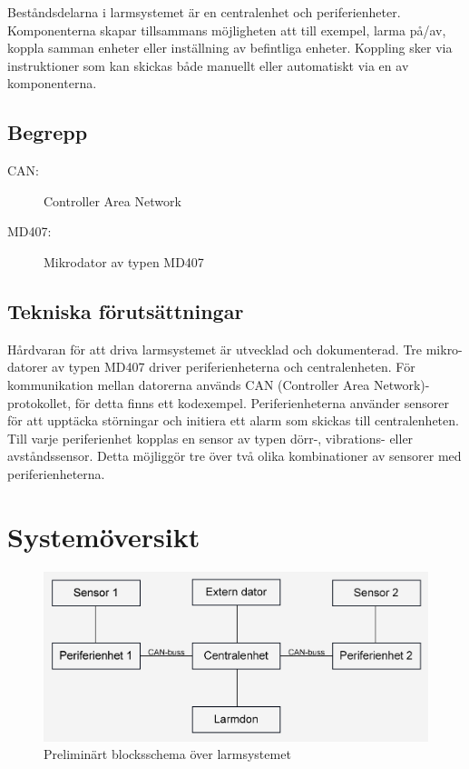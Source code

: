 \documentclass[a4paper]{article}
\begin{document}
Beståndsdelarna i larmsystemet är en centralenhet och periferienheter. Komponenterna skapar tillsammans möjligheten att till exempel, larma på/av, koppla samman enheter eller inställning av befintliga enheter. Koppling sker via instruktioner som kan skickas både manuellt eller automatiskt via en av komponenterna.

\subsection{Begrepp}

\begin{description}
    \item[CAN:] Controller Area Network
    \item[MD407:] Mikrodator av typen MD407
\end{description}


\subsection{Tekniska förutsättningar}

Hårdvaran för att driva larmsystemet är utvecklad och dokumenterad. Tre mikro-datorer av typen MD407 driver periferienheterna och centralenheten. För kommunikation mellan datorerna används CAN (Controller Area Network)-protokollet, för detta finns ett kodexempel. Periferienheterna använder sensorer för att upptäcka störningar och initiera ett alarm som skickas till centralenheten. Till varje periferienhet kopplas en sensor av typen dörr-, vibrations- eller avståndssensor. Detta möjliggör tre över två olika kombinationer av sensorer med periferienheterna.

\section{Systemöversikt}

\begin{figure}[H]
    \centering
    \includegraphics[width=\textwidth]{blockschema.png}
    \caption{Preliminärt blocksschema över larmsystemet}
\end{figure}
\end{document}
